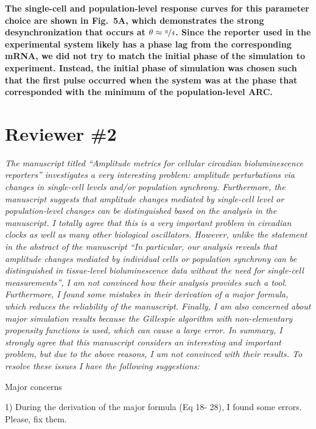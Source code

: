 \documentclass[11pt, letterpaper]{article}
\newenvironment{reviewer}{\itshape\color{gray}}{}
\newenvironment{manuscript}[1]{\begin{center}\begin{tcolorbox}[colback=green!5!white,colframe=green!75!black,width=0.8\textwidth,title={#1},breakable,fonttitle=\bfseries]}{\end{tcolorbox}\end{center}}
\begin{document}
\begin{manuscript}{Page 16}
\bfseries
The single-cell and population-level response curves for this parameter choice are shown in Fig.~5A, which demonstrates the strong desynchronization that occurs at $\theta\approx\nicefrac{\pi}{4}$.
Since the reporter used in the experimental system likely has a phase lag from the corresponding mRNA, we did not try to match the initial phase of the simulation to experiment.
Instead, the initial phase of simulation was chosen such that the first pulse occurred when the system was at the phase that corresponded with the minimum of the population-level ARC.
\end{manuscript}

\section*{Reviewer \#2}

\begin{reviewer}
The manuscript titled ``Amplitude metrics for cellular circadian bioluminescence reporters'' investigates a very interesting problem: amplitude perturbations via changes in single-cell levels and/or population synchrony.
Furthermore, the manuscript suggests that amplitude changes mediated by single-cell level or population-level changes can be distinguished based on the analysis in the manuscript.
I totally agree that this is a very important problem in circadian clocks as well as many other biological oscillators.
However, unlike the statement in the abstract of the manuscript ``In particular, our analysis reveals that amplitude changes mediated by individual cells or population synchrony can be distinguished in tissue-level bioluminescence data without the need for single-cell measurements'', I am not convinced how their analysis provides such a tool.
Furthermore, I found some mistakes in their derivation of a major formula, which reduces the reliability of the manuscript.
Finally, I am also concerned about major simulation results because the Gillespie algorithm with non-elementary propensity functions is used, which can cause a large error.
In summary, I strongly agree that this manuscript considers an interesting and important problem, but due to the above reasons, I am not convinced with their results.
To resolve these issues I have the following suggestions: 
 
Major concerns 
 
1) During the derivation of the major formula (Eq 18- 28), I found some errors. Please, fix them.
\end{reviewer}
\end{document}
